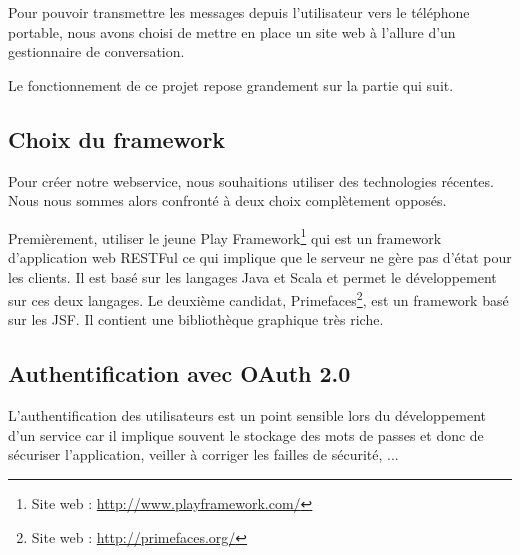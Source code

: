 Pour pouvoir transmettre les messages depuis l'utilisateur vers le téléphone portable, nous avons
choisi de mettre en place un site web à l'allure d'un gestionnaire de conversation. 

Le fonctionnement de ce projet repose grandement sur la partie qui suit.




\subsection{Choix du framework}

Pour créer notre webservice, nous souhaitions utiliser des technologies récentes.
Nous nous sommes alors confronté à deux choix complètement opposés.

Premièrement, utiliser le jeune Play Framework\footnote{Site web : \href{http://www.playframework.com/}{http://www.playframework.com/}} qui est un framework d'application web RESTFul ce qui implique que le serveur ne gère pas d'état pour les clients.
Il est basé sur les langages Java et Scala et permet le développement sur ces deux langages.
Le deuxième candidat, Primefaces\footnote{Site web : \href{http://primefaces.org/}{http://primefaces.org/}}, est un framework basé sur les JSF.
Il contient une bibliothèque graphique très riche.




\subsection{Authentification avec OAuth 2.0}
\label{Authentification avec OAuth 2.0}

L'authentification des utilisateurs est un point sensible lors du développement d'un service car il
implique souvent le stockage des mots de passes et donc de sécuriser l'application, veiller à corriger
les failles de sécurité, ... 

